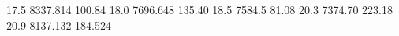 17.5 8337.814 100.84
18.0 7696.648 135.40
18.5 7584.5 81.08
20.3 7374.70 223.18
20.9 8137.132 184.524